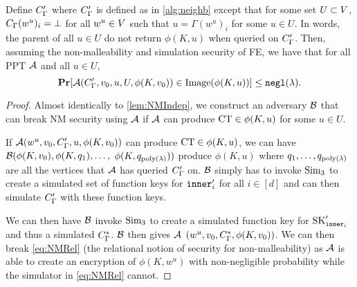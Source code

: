 \begin{lemma}
		\label{lem:NMIndepA}
		Define $C_\Gamma'$ where $C_\Gamma'$ is defined as in \cref{alg:neighb} except that
		for some set $U \subset V$, $C_\Gamma(w^u)_i = \bot$ for all $w^u \in V$ such that $u = \Gamma(w^u)_i$ for some $u \in U$.
		In words, the parent of all $u \in U$ do not return $\phi(K, u)$ when queried on $C_\Gamma'$.
		Then, assuming the non-malleability and simulation security of FE, we have that for all PPT $\mathcal{A}$
		and all $u \in U$,
		\begin{equation}
			\operatorname*{\mathbf{Pr}}[\mathcal{A}(C_\Gamma', v_0, u, U, \phi(K, v_0)) \in \text{Image}(\phi(K, u))] \leq \texttt{negl}(\lambda).
		\end{equation}
		\begin{proof}
			Almost identically to \cref{lem:NMIndep}, we construct an adversary $\mathcal{B}$ that can break NM security using $\mathcal{A}$ if $\mathcal{A}$ can
			produce $\text{CT} \in \phi(K, u)$ for some $u \in U$.
			
			If $\mathcal{A}(w^u, v_0, C_\Gamma', u, \phi(K, v_0))$ can produce $\text{CT} \in \phi(K, u)$,
			we can have $\mathcal{B}(\phi(K, v_0), \phi(K, q_1), \dots,$ $ \phi(K,q_{\operatorname{poly}(\lambda)}))$ 
			produce $\phi(K, u)$ where $q_1, \dots, q_{\operatorname{poly}(\lambda)}$ are all the vertices that $\mathcal{A}$ has queried $C_\Gamma'$ on.
			$\mathcal{B}$ simply has to invoke $\text{Sim}_3$ to create a simulated set of function keys for $\texttt{inner}_i'$ for all $i \in [d]$
			and can then simulate $C_\Gamma'$ with these function keys.

			We can then have $\mathcal{B}$ invoke $\text{Sim}_3$ to create a simulated function key for $\text{SK}_{\texttt{inner}_i}'$
			and thus a simulated $C_\Gamma^{*}$.
			$\mathcal{B}$ then gives $\mathcal{A}$ $(w^u, v_0, C_\Gamma^{*}, \phi(K, v_0))$.
			We can then break \cref{eq:NMRel} (the relational notion of security for non-malleability) as $\mathcal{A}$ is able to create an encryption of $\phi(K, w^u)$ with non-negligible probability while the simulator 
			in \cref{eq:NMRel} cannot.
		\end{proof}
\end{lemma}
